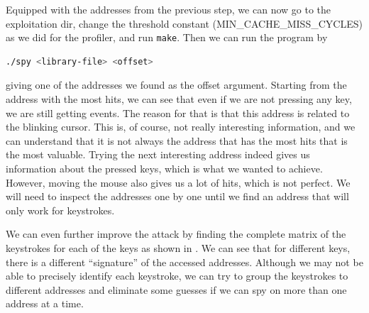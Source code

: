 Equipped with the addresses from the previous step, we can now go to the
exploitation dir, change the threshold constant (MIN\_CACHE\_MISS\_CYCLES) as we
did for the profiler, and run \texttt{make}. Then we can run the program by 
\begin{lstlisting}[language=bash]
./spy <library-file> <offset>
\end{lstlisting}
giving one of the addresses we found as the offset argument. Starting from the
address with the most hits, we can see that even if we are not pressing any key,
we are still getting events. The reason for that is that this address is related
to the blinking cursor. This is, of course, not really interesting information,
and we can understand that it is not always the address that has the most hits
that is the most valuable. Trying the next interesting address indeed gives us
information about the pressed keys, which is what we wanted to achieve. However,
moving the mouse also gives us a lot of hits, which is not perfect. We will need to inspect the addresses one by one until we find an address that will only work for keystrokes.

We can even further improve the attack by finding the complete matrix of the
keystrokes for each of the keys as shown in . We
can see that for different keys, there is a different “signature” of the
accessed addresses. Although we may not be able to precisely identify each keystroke, we can try to group the keystrokes to different addresses and eliminate some guesses if we can spy on more than one address at a time.

